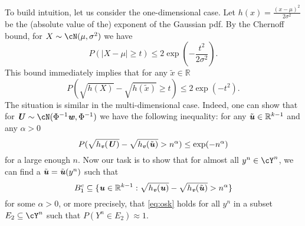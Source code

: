 \documentclass[11pt,onecolumn]{IEEEtran}
\def\mathbi#1{{\textbf{\textit #1}}}
\begin{document}
To build intuition, let us consider the one-dimensional case. Let $h(x)=\frac{(x-\mu)^2}{2\sigma^2}$ be the (absolute value of the) exponent of the Gaussian pdf. By the Chernoff bound, for $X\sim \cN(\mu,\sigma^2)$ we have
   \begin{equation}\label{eq:Chernoff}
P(|X-\mu|\ge t) \le 2 \exp(-\frac{t^2}{2\sigma^2}).
  \end{equation}
This bound immediately implies that for any $\tilde{x} \in \mathbb{R}$
$$
P(\sqrt{h(X)}-\sqrt{h(\tilde{x})} \ge t) \le 2 \exp(-t^2).
$$
The situation is similar in the multi-dimensional case. Indeed, one can show that for $\mathbi{U} \sim \cN(\Phi^{-1}\mathbi{w}, \Phi^{-1})$ we have the following inequality: for any $\tilde{\mathbi{u}}\in\mathbb{R}^{k-1}$ 
and any $\alpha>0$
$$
P(\sqrt{h_{\mathbi{v}}(\mathbi{U})} - \sqrt{h_{\mathbi{v}}(\tilde{\mathbi{u}})} > n^\alpha)
\le \exp(-n^{\alpha})
$$
for a large enough $n.$
Now our task is to show that for almost all $y^n\in\cY^n$, we can find a $\tilde{\mathbi{u}}=\tilde{\mathbi{u}}(y^n)$ such that
\begin{equation}\label{eq:osk}
B_1^c \subseteq \{\mathbi{u}\in\mathbb{R}^{k-1}:
\sqrt{h_{\mathbi{v}}(\mathbi{u})} - \sqrt{h_{\mathbi{v}}(\tilde{\mathbi{u}})} > n^\alpha \}
\end{equation}
for some $\alpha>0$, or more precisely, that \eqref{eq:osk} holds for all $y^n$ in a subset $E_2\subseteq \cY^n$ such that $P(Y^n\in E_2)\approx 1$.
\end{document}
